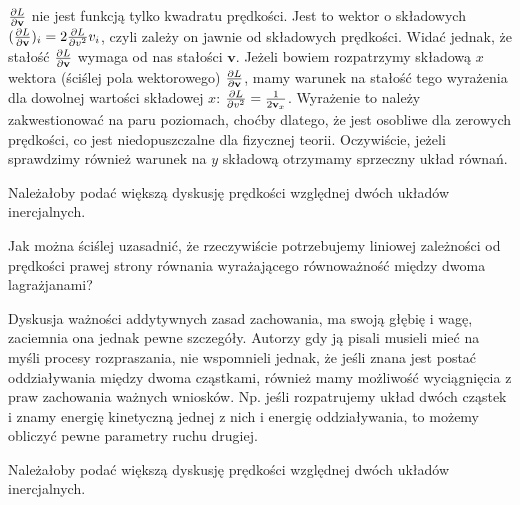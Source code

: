 \documentclass[a4paper,11pt]{article}
\begin{document}
\start {} $\frac{ \partial L }{ \partial \mathbf{v} }$ nie jest funkcją tylko
kwadratu prędkości. Jest to wektor o składowych
$( \frac{ \partial L }{ \partial \mathbf{v} } )_{ i } = 2 \frac{
  \partial L }{ \partial { v^{ 2 } } } v_{ i }$, czyli zależy on
jawnie od składowych prędkości. Widać jednak, że stałość
$\frac{ \partial L }{ \partial \mathbf{v} }$ wymaga od nas stałości
$\mathbf{ v }$. Jeżeli bowiem rozpatrzymy składową $x$ wektora
(ściślej pola wektorowego)
$\frac{ \partial L }{ \partial \mathbf{v} }$, mamy warunek na stałość
tego wyrażenia dla dowolnej wartości składowej $x$:
$\frac{ \partial L }{ \partial { v^{ 2 } } } = \frac{ 1 }{ 2
  \mathbf{v}_{ x } }$. Wyrażenie to należy zakwestionować na paru
poziomach, choćby dlatego, że jest osobliwe dla zerowych prędkości, co
jest niedopuszczalne dla fizycznej teorii. Oczywiście, jeżeli
sprawdzimy również warunek na $y$ składową otrzymamy sprzeczny układ
równań.

\vspace{\spaceFour}



\start {} Należałoby podać większą dyskusję prędkości względnej
dwóch układów inercjalnych.

\vspace{\spaceFour}



\start {} Jak można ściślej uzasadnić, że rzeczywiście
potrzebujemy liniowej zależności od prędkości prawej strony równania
wyrażającego równoważność między dwoma lagrażjanami? \Dok

\vspace{\spaceFour}



\start {} Dyskusja ważności addytywnych zasad zachowania, ma
swoją głębię i wagę, zaciemnia ona jednak pewne szczegóły. Autorzy gdy
ją pisali musieli mieć na myśli procesy rozpraszania, nie wspomnieli
jednak, że jeśli znana jest postać oddziaływania między dwoma
cząstkami, również mamy możliwość wyciągnięcia z praw zachowania
ważnych wniosków. Np. jeśli rozpatrujemy układ dwóch cząstek i znamy
energię kinetyczną jednej z nich i energię oddziaływania, to możemy
obliczyć pewne parametry ruchu drugiej.

\vspace{\spaceFour}



\start {} Należałoby podać większą dyskusję prędkości względnej
dwóch układów inercjalnych.
\end{document}
